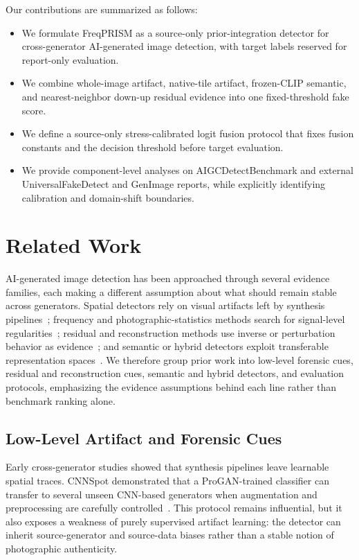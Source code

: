 \documentclass[lettersize,journal]{IEEEtran}
\begin{document}
Our contributions are summarized as follows:
\begin{itemize}
    \item We formulate FreqPRISM as a source-only prior-integration detector for cross-generator AI-generated image detection, with target labels reserved for report-only evaluation.
    \item We combine whole-image artifact, native-tile artifact, frozen-CLIP semantic, and nearest-neighbor down-up residual evidence into one fixed-threshold fake score.
    \item We define a source-only stress-calibrated logit fusion protocol that fixes fusion constants and the decision threshold before target evaluation.
    \item We provide component-level analyses on AIGCDetectBenchmark and external UniversalFakeDetect and GenImage reports, while explicitly identifying calibration and domain-shift boundaries.
\end{itemize}

\section{Related Work}
\label{sec:related_work}

AI-generated image detection has been approached through several evidence families, each making a different assumption about what should remain stable across generators. Spatial detectors rely on visual artifacts left by synthesis pipelines~\cite{wang2020cnnspot,liu2020gramnet,zhong2023patchcraft}; frequency and photographic-statistics methods search for signal-level regularities~\cite{frank2020frequency,liu2022realimages,zhong2025beyond}; residual and reconstruction methods use inverse or perturbation behavior as evidence~\cite{tan2023lgrad,tan2024npr,wang2023dire}; and semantic or hybrid detectors exploit transferable representation spaces~\cite{radford2021clip,ojha2023univfd,yan2025aide,cheng2025cospy}. We therefore group prior work into low-level forensic cues, residual and reconstruction cues, semantic and hybrid detectors, and evaluation protocols, emphasizing the evidence assumptions behind each line rather than benchmark ranking alone.

\subsection{Low-Level Artifact and Forensic Cues}
Early cross-generator studies showed that synthesis pipelines leave learnable spatial traces. CNNSpot demonstrated that a ProGAN-trained classifier can transfer to several unseen CNN-based generators when augmentation and preprocessing are carefully controlled~\cite{wang2020cnnspot}. This protocol remains influential, but it also exposes a weakness of purely supervised artifact learning: the detector can inherit source-generator and source-data biases rather than a stable notion of photographic authenticity.
\end{document}
